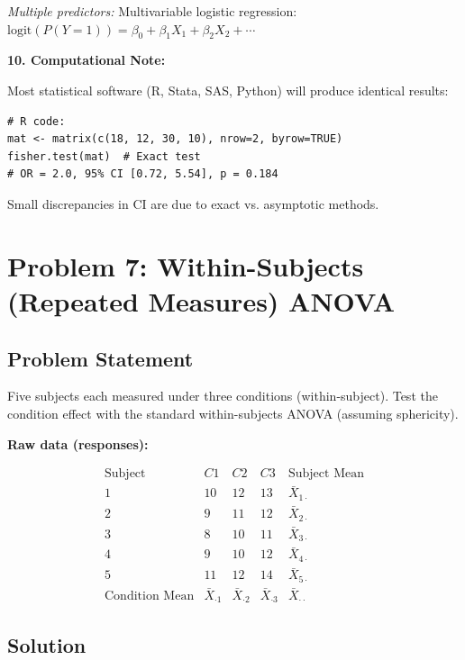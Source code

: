 \documentclass[12pt]{article}
\begin{document}
\begin{explanation}
\textit{Multiple predictors:} Multivariable logistic regression: $\text{logit}(P(Y=1)) = \beta_0 + \beta_1 X_1 + \beta_2 X_2 + \cdots$

\textbf{10. Computational Note:}

Most statistical software (R, Stata, SAS, Python) will produce identical results:
\begin{verbatim}
# R code:
mat <- matrix(c(18, 12, 30, 10), nrow=2, byrow=TRUE)
fisher.test(mat)  # Exact test
# OR = 2.0, 95% CI [0.72, 5.54], p = 0.184
\end{verbatim}

Small discrepancies in CI are due to exact vs. asymptotic methods.
\end{explanation}

\newpage

\section{Problem 7: Within-Subjects (Repeated Measures) ANOVA}

\subsection{Problem Statement}

Five subjects each measured under three conditions (within-subject). Test the condition effect with the standard within-subjects ANOVA (assuming sphericity).

\textbf{Raw data (responses):}

\[\begin{array}{c|ccc|c}
\text{Subject} & C1 & C2 & C3 & \text{Subject Mean} \\
\hline
1 & 10 & 12 & 13 & \bar{X}_{1\cdot} \\
2 & 9 & 11 & 12 & \bar{X}_{2\cdot} \\
3 & 8 & 10 & 11 & \bar{X}_{3\cdot} \\
4 & 9 & 10 & 12 & \bar{X}_{4\cdot} \\
5 & 11 & 12 & 14 & \bar{X}_{5\cdot} \\
\hline
\text{Condition Mean} & \bar{X}_{\cdot 1} & \bar{X}_{\cdot 2} & \bar{X}_{\cdot 3} & \bar{X}_{\cdot\cdot}
\end{array}\]

\subsection{Solution}
\end{document}
